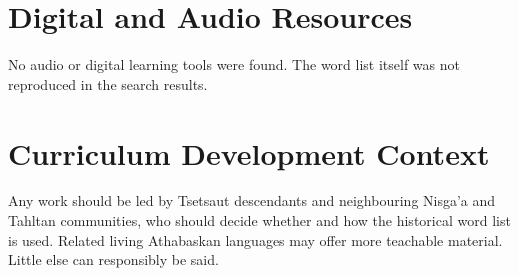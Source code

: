 \documentclass[12pt]{article}
\begin{document}
\section{Digital and Audio Resources}
No audio or digital learning tools were found. The word list itself was not reproduced in the search results.

\section{Curriculum Development Context}
Any work should be led by Tsetsaut descendants and neighbouring Nisga'a and Tahltan communities, who should decide whether and how the historical word list is used. Related living Athabaskan languages may offer more teachable material. Little else can responsibly be said.
\end{document}
